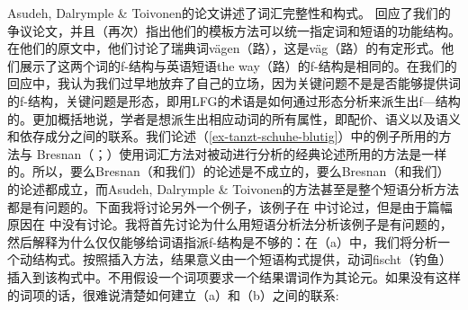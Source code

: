 Asudeh, Dalrymple \& Toivonen的论文讲述了词汇完整性和构式。 \citet{AT2014a}回应了我们的争议论文，并且（再次）指出他们的模板方法可以统一指定词和短语的功能结构。在他们的原文中，他们讨论了瑞典词vägen（路），这是väg（路）的有定形式。他们展示了这两个词的f-结构与英语短语the way（路）的f-结构是相同的。在我们\citeyearpar{MWArgStReply}的回应中，我认为我们过早地放弃了自己的立场，因为关键问题不是是否能够提供词的f-结构，关键问题是形态，即用LFG的术语是如何通过形态分析来派生出f—结构的。更加概括地说，学者是想派生出相应动词的所有属性，即配价、语义以及语义和依存成分之间的联系。我们论述（\ref{ex-tanzt-schuhe-blutig}）中的例子所用的方法与 Bresnan（\citeyear[]{Bresnan82a}；\citeyear[]{Bresnan2001a}）使用词汇方法对被动进行分析的经典论述所用的方法是一样的。所以，要么Bresnan（和我们）的论述是不成立的，要么Bresnan（和我们）的论述都成立，而Asudeh, Dalrymple \& Toivonen的方法甚至是整个短语分析方法都是有问题的。下面我将讨论另外一个例子，该例子在 中讨论过，但是由于篇幅原因在 中没有讨论。我将首先讨论为什么用短语分析法分析该例子是有问题的，然后解释为什么仅仅能够给词语指派f-结构是不够的：在（a）中，我们将分析一个动结构式。按照插入方法，结果意义由一个短语构式提供，动词fischt（钓鱼）插入到该构式中。不用假设一个词项要求一个结果谓词作为其论元。如果没有这样的词项的话，很难说清楚如何建立（a）和（b）之间的联系:
